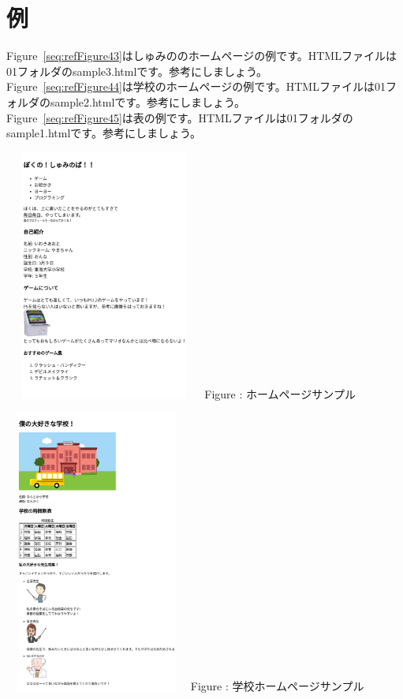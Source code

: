 \documentclass[a4paper,12pt]{jarticle}
\begin{document}
\section{例}
 {Figure~\ref{seq:refFigure43}はしゅみののホームページの例です。HTMLファイルは01フォルダのsample3.htmlです。参考にしましょう。}\\
{Figure~\ref{seq:refFigure44}は学校のホームページの例です。HTMLファイルは01フォルダのsample2.htmlです。参考にしましょう。}\\
{Figure~\ref{seq:refFigure45}は表の例です。HTMLファイルは01フォルダのsample1.htmlです。参考にしましょう。}\\

\centering
\begin{minipage}{7.518cm}
  {\upshape
    \includegraphics[width=6.525cm,height=8.262cm]{textbook-img209.png}
    \newline
    Figure {\theFigure\label{seq:refFigure43}}:
    ホームページサンプル}
\end{minipage}
\begin{minipage}{7.703cm}
  {\upshape
    \includegraphics[width=6.062cm,height=9.306cm]{textbook-img210.png}
    \newline
    Figure {\theFigure\label{seq:refFigure44}}:
    学校ホームページサンプル}
\end{minipage}
\end{document}
